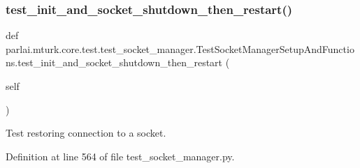 \subsubsection{\texorpdfstring{test\+\_\+init\+\_\+and\+\_\+socket\+\_\+shutdown\+\_\+then\+\_\+restart()}{test\_init\_and\_socket\_shutdown\_then\_restart()}}
{\footnotesize\ttfamily def parlai.\+mturk.\+core.\+test.\+test\+\_\+socket\+\_\+manager.\+Test\+Socket\+Manager\+Setup\+And\+Functions.\+test\+\_\+init\+\_\+and\+\_\+socket\+\_\+shutdown\+\_\+then\+\_\+restart (\begin{DoxyParamCaption}\item[{}]{self }\end{DoxyParamCaption})}

\begin{DoxyVerb}Test restoring connection to a socket.
\end{DoxyVerb}
 

Definition at line 564 of file test\+\_\+socket\+\_\+manager.\+py.


